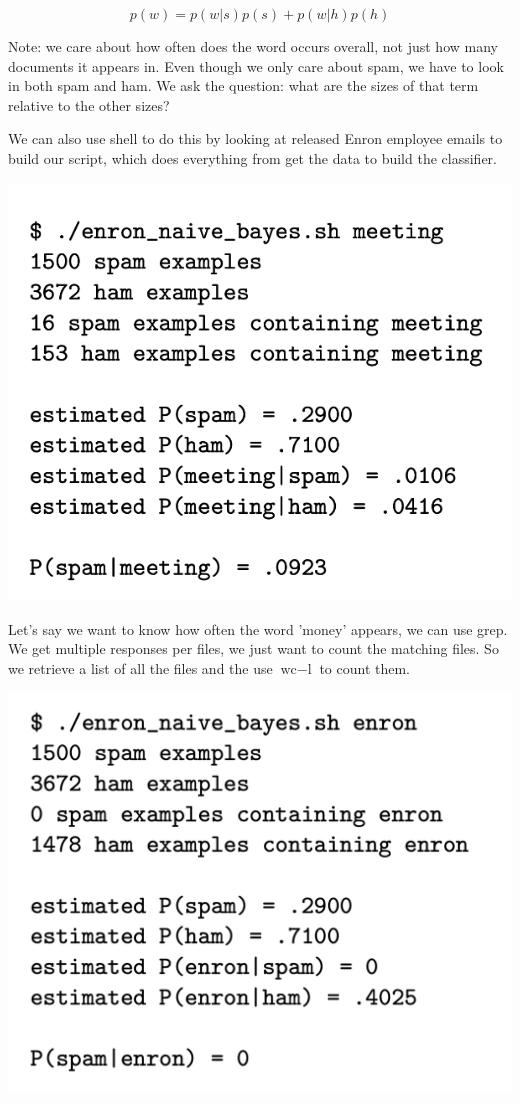 $$p(w) = p(w | s)p(s) + p(w |h)p(h)$$

Note: we care about how often does the word occurs overall, not just how many documents it appears in. Even though we only care about spam, we have to look in both spam and ham. We ask the question: what are the sizes of that term relative to the other sizes?

We can also use shell to do this by looking at released Enron employee emails to build our script, which does everything from get the data to build the classifier. 

\includegraphics[scale=0.25]{ask2256/figures/enronsh.png}

Let's say we want to know how often the word 'money' appears, we can use grep. We get multiple responses per files, we just want to count the matching files. So we retrieve a list of all the files and the use $\text{wc} - \text{l}$ to count them. 

\includegraphics[scale=0.25]{ask2256/figures/enronsh2.png}

